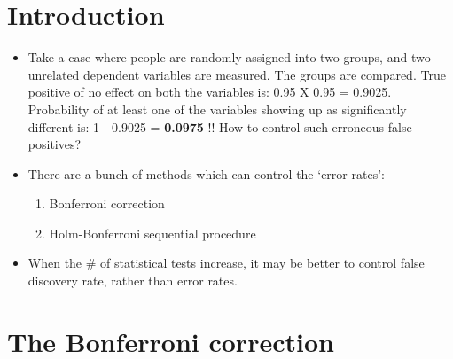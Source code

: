 \documentclass[
]{book}
\providecommand{\tightlist}{%
  \setlength{\itemsep}{0pt}\setlength{\parskip}{0pt}}
\begin{document}
\hypertarget{introduction}{%
\section{Introduction}\label{introduction}}

\begin{itemize}
\item
  Take a case where people are randomly assigned into two groups, and two unrelated dependent variables are measured. The groups are compared. True positive of no effect on both the variables is: 0.95 X 0.95 = 0.9025. Probability of at least one of the variables showing up as significantly different is: 1 - 0.9025 = \textbf{0.0975} !! How to control such erroneous false positives?
\item
  There are a bunch of methods which can control the `error rates':

  \begin{enumerate}
  \def\labelenumi{\arabic{enumi}.}
  \tightlist
  \item
    Bonferroni correction
  \item
    Holm-Bonferroni sequential procedure
  \end{enumerate}
\item
  When the \# of statistical tests increase, it may be better to control false discovery rate, rather than error rates.
\end{itemize}

\hypertarget{the-bonferroni-correction}{%
\section{The Bonferroni correction}\label{the-bonferroni-correction}}
\end{document}
